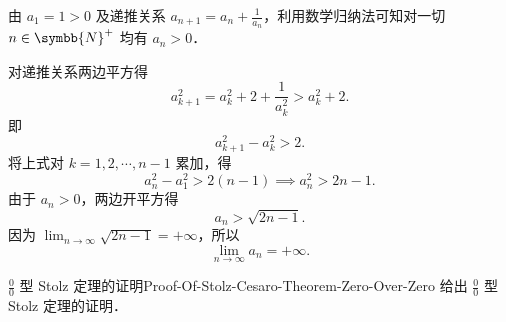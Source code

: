 \begin{myproof}
    由 $a_1 = 1 > 0$ 及递推关系 $a_{n+1} = a_n + \frac{1}{a_n}$，利用数学归纳法可知对一切 $n \in \symbb{N}^+$ 均有 $a_n > 0$．

    对递推关系两边平方得
    \begin{equation}
        a_{k+1}^2 = a_k^2 + 2 + \frac{1}{a_k^2} > a_k^2 + 2.
    \end{equation}
    即
    \begin{equation}
        a_{k+1}^2 - a_k^2 > 2.
    \end{equation}
    将上式对 $k = 1, 2, \cdots, n-1$ 累加，得
    \begin{equation}
        a_n^2 - a_1^2 > 2(n - 1) \implies a_n^2 > 2n - 1.
    \end{equation}
    由于 $a_n > 0$，两边开平方得
    \begin{equation}
        a_n > \sqrt{2n - 1}.
    \end{equation}
    因为 $\lim_{n\to\infty} \sqrt{2n - 1} = +\infty$，所以
    \begin{equation}
        \lim_{n\to\infty} a_n = +\infty.
    \end{equation}
\end{myproof}

\begin{problem}{$\frac{0}{0}$ 型 Stolz 定理的证明}{Proof-Of-Stolz-Cesaro-Theorem-Zero-Over-Zero}
    给出 $\frac{0}{0}$ 型 Stolz 定理的证明．
\end{problem}

